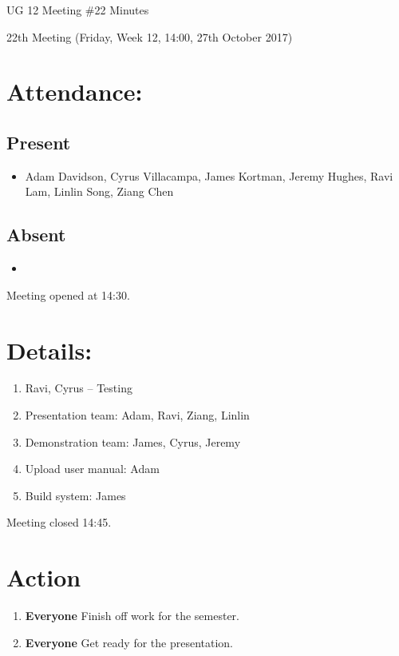 \documentclass{article}
\begin{document}
\begin{adjustwidth}{2.5em}{0pt}
\begin{center}
\Large{UG 12 Meeting \#22 Minutes}\\
\end{center}
\end{adjustwidth}

22th Meeting (Friday, Week 12, 14:00, 27th October 2017)
\section{Attendance:}
\subsection*{Present}
\begin{itemize}
\item Adam Davidson, Cyrus Villacampa, James Kortman, Jeremy Hughes, Ravi Lam, Linlin Song, Ziang Chen
\end{itemize}
\subsection*{Absent}
\begin{itemize}
\item 
\end {itemize}

Meeting opened at 14:30.
\section{Details:}
\begin{enumerate}
\item Ravi, Cyrus – Testing
\item Presentation team: Adam, Ravi, Ziang, Linlin
\item Demonstration team: James, Cyrus, Jeremy
\item Upload user manual: Adam
\item Build system: James
\end{enumerate}
Meeting closed 14:45.

\section{Action}
\begin{enumerate}
\item \textbf{Everyone} Finish off work for the semester.
\item \textbf{Everyone} Get ready for the presentation.
\end{enumerate}
\end{document}
